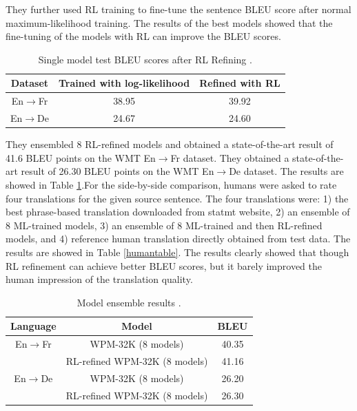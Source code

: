 They further used RL training to fine-tune the sentence BLEU score after normal maximum-likelihood training. The results of the best models showed that the fine-tuning of the models with RL can improve the BLEU scores. 


\begin{table}[h!]
\centering
 \begin{tabular}{ |ccc| } 
  \hline Dataset & Trained with log-likelihood &  Refined with RL \\ 
  \hline  En$\rightarrow$Fr &   38.95 & 39.92\\
  En$\rightarrow$De &  24.67 &  24.60\\
  \hline
 \end{tabular}
\caption{Single model test BLEU scores after RL Refining \citep{45610}.}
\end{table}

They ensembled 8 RL-refined models and obtained a state-of-the-art result of 41.6 BLEU points on the WMT En$\rightarrow$Fr dataset. They obtained a state-of-the-art result of 26.30 BLEU points on the WMT En$\rightarrow$De dataset. The results are showed in Table \ref{gootable}.For the side-by-side comparison, humans were asked to rate four translations for the given source sentence. The four translations were: 1) the best phrase-based translation downloaded from statmt website, 2) an ensemble of 8 ML-trained models, 3) an ensemble of 8 ML-trained and then RL-refined models, and 4) reference human translation directly obtained from test data. The results are showed in Table \ref{humantable}. The results clearly showed that though RL refinement can achieve better BLEU scores, but it barely improved the human impression of the translation quality. 

\begin{table}[h!]
\centering
 \begin{tabular}{ |ccc| } 
  \hline Language & Model &  BLEU \\ 
  \hline  En$\rightarrow$Fr &   WPM-32K (8 models) & 40.35\\
  &RL-refined WPM-32K (8 models)& 41.16\\
  \hline
  En$\rightarrow$De &  WPM-32K (8 models) &  26.20\\
  &RL-refined WPM-32K (8 models)&26.30\\
  \hline
 \end{tabular}
\caption{Model ensemble results \citep{45610}.}
\label{gootable}
\end{table}




